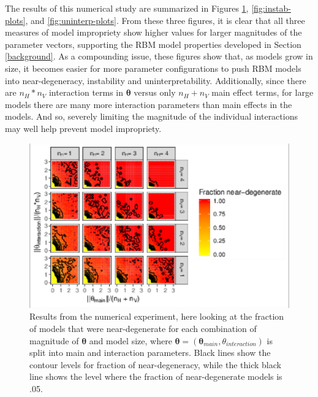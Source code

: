 \documentclass[12pt]{article}
\theoremstyle{definition}
\newcommand{\nv}{{n_{\scriptscriptstyle V}}}
\newcommand{\nh}{{n_{\scriptscriptstyle H}}}
\begin{document}
The results of this numerical study are summarized in Figures
\ref{fig:degen-plots}, \ref{fig:instab-plots}, and
\ref{fig:uninterp-plots}. From these three figures, it is clear that all
three measures of model impropriety show higher values for larger
magnitudes of the parameter vectors, supporting the RBM model properties
developed in Section \ref{background}. As a compounding issue, these
figures show that, as models grow in size, it becomes easier for more
parameter configurations to push RBM models into near-degeneracy,
instability and uninterpretability. Additionally, since there are
\(\nh*\nv\) interaction terms in \(\boldsymbol \theta\) versus only
\(\nh + \nv\) main effect terms, for large models there are many more
interaction parameters than main effects in the models. And so, severely
limiting the magnitude of the individual interactions may well help
prevent model impropriety. \par
\begin{figure}
\includegraphics{paper_files/figure-latex/degen-plots-1} \caption{Results from the numerical experiment, here looking at the fraction of models that were near-degenerate for each combination of magnitude of $\boldsymbol \theta$ and model size, where $\boldsymbol \theta = (\boldsymbol \theta_{main}, \theta_{interaction})$ is split into main and interaction parameters. Black lines show the contour levels for fraction of near-degeneracy, while the thick black line shows the level where the fraction of near-degenerate models is .05.}\label{fig:degen-plots}
\end{figure}
\end{document}
